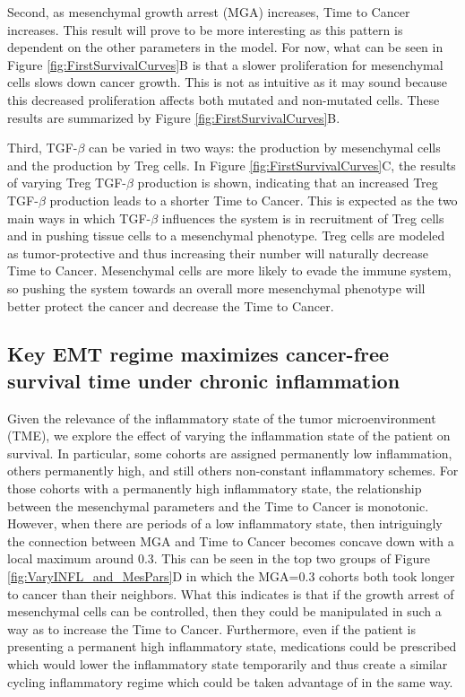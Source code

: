\documentclass[11pt, a4paper, preprint]{article}
\begin{document}
Second, as mesenchymal growth arrest (MGA) increases, Time to Cancer increases.
This result will prove to be more interesting as this pattern is dependent on the other parameters in the model.
For now, what can be seen in Figure \ref{fig:FirstSurvivalCurves}B is that a slower proliferation for mesenchymal cells slows down cancer growth.
This is not as intuitive as it may sound because this decreased proliferation affects both mutated and non-mutated cells.
These results are summarized by Figure \ref{fig:FirstSurvivalCurves}B.

Third, TGF-$\beta$ can be varied in two ways: the production by mesenchymal cells and the production by Treg cells.
In Figure \ref{fig:FirstSurvivalCurves}C, the results of varying Treg TGF-$\beta$ production is shown, indicating that an increased Treg TGF-$\beta$ production leads to a shorter Time to Cancer.
This is expected as the two main ways in which TGF-$\beta$ influences the system is in recruitment of Treg cells and in pushing tissue cells to a mesenchymal phenotype.
Treg cells are modeled as tumor-protective and thus increasing their number will naturally decrease Time to Cancer.
Mesenchymal cells are more likely to evade the immune system, so pushing the system towards an overall more mesenchymal phenotype will better protect the cancer and decrease the Time to Cancer.

\subsection{Key EMT regime maximizes cancer-free survival time under chronic inflammation}\label{KeyEMT}
Given the relevance of the inflammatory state of the tumor microenvironment (TME), we explore the effect of varying the inflammation state of the patient on survival.
In particular, some cohorts are assigned permanently low inflammation, others permanently high, and still others non-constant inflammatory schemes.
For those cohorts with a permanently high inflammatory state, the relationship between the mesenchymal parameters and the Time to Cancer is monotonic.
However, when there are periods of a low inflammatory state, then intriguingly the connection between MGA and Time to Cancer becomes concave down with a local maximum around 0.3.
This can be seen in the top two groups of Figure \ref{fig:VaryINFL_and_MesPars}D in which the MGA=0.3 cohorts both took longer to cancer than their neighbors.
What this indicates is that if the growth arrest of mesenchymal cells can be controlled, then they could be manipulated in such a way as to increase the Time to Cancer.
Furthermore, even if the patient is presenting a permanent high inflammatory state, medications could be prescribed which would lower the inflammatory state temporarily and thus create a similar cycling inflammatory regime which could be taken advantage of in the same way.
\end{document}
